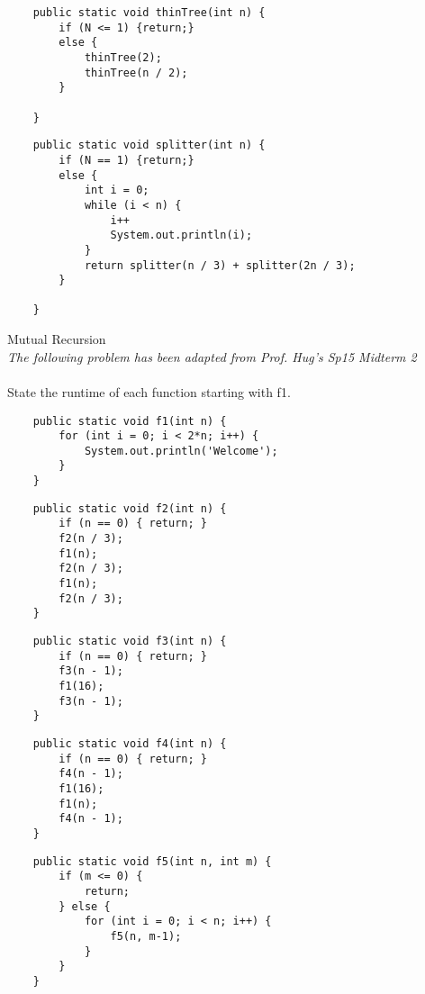 \documentclass[11pt,letterpaper]{article}
\begin{document}
\begin{lstlisting}
    public static void thinTree(int n) {
        if (N <= 1) {return;}
        else {
            thinTree(2);
            thinTree(n / 2);
        }
        
    }
\end{lstlisting}
\pspace
\pspace
\pspace
\pspace

\begin{lstlisting}
    public static void splitter(int n) {
        if (N == 1) {return;}
        else {
            int i = 0;
            while (i < n) {
                i++
                System.out.println(i);
            }
            return splitter(n / 3) + splitter(2n / 3);
        }
        
    }
\end{lstlisting}
\newpage




\problem Mutual Recursion 
\\
\textit{The following problem has been adapted from Prof. Hug's Sp15 Midterm 2}
\\
\\
State the runtime of each function starting with f1.
\begin{lstlisting}
    public static void f1(int n) {
        for (int i = 0; i < 2*n; i++) {
            System.out.println('Welcome');
        }
    }
\end{lstlisting}

\begin{lstlisting}
    public static void f2(int n) {
        if (n == 0) { return; }
        f2(n / 3);
        f1(n);
        f2(n / 3);
        f1(n);
        f2(n / 3);
    }
\end{lstlisting}

\begin{lstlisting}
    public static void f3(int n) {
        if (n == 0) { return; }
        f3(n - 1);
        f1(16);
        f3(n - 1);
    }
\end{lstlisting}

\begin{lstlisting}
    public static void f4(int n) {
        if (n == 0) { return; }
        f4(n - 1);
        f1(16);
        f1(n);
        f4(n - 1);
    }
\end{lstlisting}

\begin{lstlisting}
    public static void f5(int n, int m) {
        if (m <= 0) {
            return;
        } else {
            for (int i = 0; i < n; i++) {
                f5(n, m-1);
            }
        }
    }
\end{lstlisting}
\end{document}
